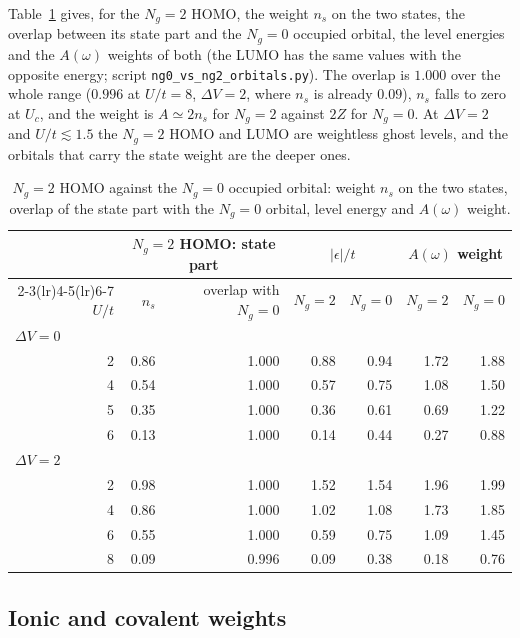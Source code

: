 \documentclass[11pt]{article}
\newcommand{\Ng}{N_{g}}
\newcommand{\dV}{\Delta V}
\begin{document}
Table~\ref{tab:orbcomp} gives, for the $\Ng=2$ HOMO, the weight $n_s$ on the two states, the overlap between its state part and the $\Ng=0$ occupied orbital, the level energies and the $A(\omega)$ weights of both (the LUMO has the same values with the opposite energy; script \texttt{ng0\_vs\_ng2\_orbitals.py}). The overlap is $1.000$ over the whole range ($0.996$ at $U/t=8$, $\dV=2$, where $n_s$ is already $0.09$), $n_s$ falls to zero at $U_c$, and the weight is $A\simeq2n_s$ for $\Ng=2$ against $2Z$ for $\Ng=0$. At $\dV=2$ and $U/t\lesssim1.5$ the $\Ng=2$ HOMO and LUMO are weightless ghost levels, and the orbitals that carry the state weight are the deeper ones.

\begin{table}[H]
\centering\small
\begin{tabular}{r rr rr rr}
\toprule
 & \multicolumn{2}{c}{$\Ng=2$ HOMO: state part} & \multicolumn{2}{c}{$|\epsilon|/t$} & \multicolumn{2}{c}{$A(\omega)$ weight}\\
\cmidrule(lr){2-3}\cmidrule(lr){4-5}\cmidrule(lr){6-7}
$U/t$ & $n_s$ & overlap with $\Ng=0$ & $\Ng=2$ & $\Ng=0$ & $\Ng=2$ & $\Ng=0$\\
\midrule
\multicolumn{7}{l}{$\dV=0$}\\
2 & 0.86 & 1.000 & 0.88 & 0.94 & 1.72 & 1.88\\
4 & 0.54 & 1.000 & 0.57 & 0.75 & 1.08 & 1.50\\
5 & 0.35 & 1.000 & 0.36 & 0.61 & 0.69 & 1.22\\
6 & 0.13 & 1.000 & 0.14 & 0.44 & 0.27 & 0.88\\
\midrule
\multicolumn{7}{l}{$\dV=2$}\\
2 & 0.98 & 1.000 & 1.52 & 1.54 & 1.96 & 1.99\\
4 & 0.86 & 1.000 & 1.02 & 1.08 & 1.73 & 1.85\\
6 & 0.55 & 1.000 & 0.59 & 0.75 & 1.09 & 1.45\\
8 & 0.09 & 0.996 & 0.09 & 0.38 & 0.18 & 0.76\\
\bottomrule
\end{tabular}
\caption{$\Ng=2$ HOMO against the $\Ng=0$ occupied orbital: weight $n_s$ on the two states, overlap of the state part with the $\Ng=0$ orbital, level energy and $A(\omega)$ weight.}
\label{tab:orbcomp}
\end{table}

\subsection{Ionic and covalent weights}
\end{document}
